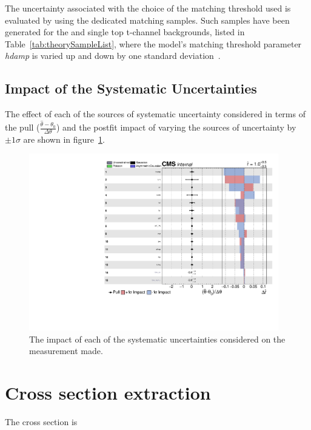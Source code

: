 The uncertainty associated with the choice of the matching threshold used is evaluated by using the dedicated matching samples.
Such samples have been generated for the \ttbar and single top t-channel backgrounds, listed in Table~\ref{tab:theorySampleList}, where the model's matching threshold parameter \emph{hdamp} is varied up and down by one standard deviation~\cite{CMS:2016kle}.

\subsection{Impact of the Systematic Uncertainties}\label{sec:uncertainitiesImpact}
The effect of each of the sources of systematic uncertainty considered in terms of the pull ($\frac{ \hat{\theta} - \theta_{0} }{\Delta \theta}$) and the postfit impact of varying the sources of uncertainty by $\pm 1 \sigma$ are shown in figure~\ref{fig:systematicsPull}.


\begin{figure}[htbp]
\begin{center}
\includegraphics[width=0.97\textwidth]{figs/results/systematicsImpact.pdf}
\caption{The impact of each of the systematic uncertainties considered on the measurement made.}
\label{fig:systematicsPull}
\end{center}
\end{figure}

\section{Cross section extraction}
The cross section is 


